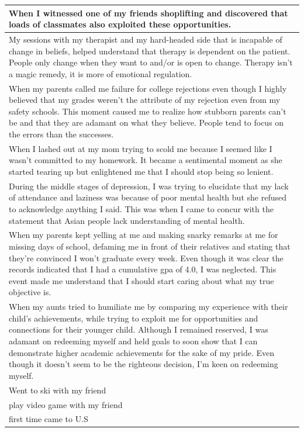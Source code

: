 \documentclass[
  .7em,
  letterpaper,
  DIV=11,
  numbers=noendperiod]{scrartcl}
\begin{document}
\begin{table}
\begin{tabular}{l}
\hline
When I witnessed one of my friends shoplifting and discovered that loads of classmates also exploited these opportunities.\\
\hline
My sessions with my therapist and my hard-headed side that is incapable of change in beliefs, helped understand that therapy is dependent on the patient. People only change when they want to and/or is open to change. Therapy isn't a magic remedy, it is more of emotional regulation.\\
\hline
When my parents called me failure for college rejections even though I highly believed that my grades weren't the attribute of my rejection even from my safety schools. This moment caused me to realize how stubborn parents can't be and that they are adamant on what they believe. People tend to focus on the errors than the successes.\\
\hline
When I lashed out at my mom trying to scold me because I seemed like I wasn't committed to my homework. It became a sentimental moment as she started tearing up but enlightened me that I should stop being so lenient.\\
\hline
During the middle stages of depression, I was trying to elucidate that my lack of attendance and laziness was because of poor mental health but she refused to acknowledge anything I said. This was when I came to concur with the statement that Asian people lack understanding of mental health.\\
\hline
When my parents kept yelling at me and making snarky remarks at me for missing days of school, defaming me in front of their relatives and stating that they're convinced I won't graduate every week. Even though it was clear the records indicated that I had a cumulative gpa of 4.0, I was neglected. This event made me understand that I should start caring about what my true objective is.\\
\hline
When my aunts tried to humiliate me by comparing my experience with their child's achievements, while trying to exploit me for opportunities and connections for their younger child. Although I remained reserved, I was adamant on redeeming myself and held goals to soon show that I can demonstrate higher academic achievements for the sake of my pride. Even though it doesn't seem to be the righteous decision, I'm keen on redeeming myself.\\
\hline
Went to ski with my friend\\
\hline
play video game with my friend\\
\hline
first time came to U.S\\

\end{tabular}
\end{table}
\end{document}
